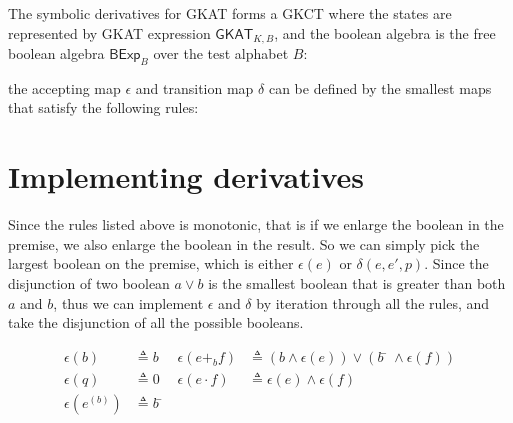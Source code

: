 \documentclass[acmsmall,screen]{acmart}
\newcommand{\theoryOf}[1]{\ensuremath{\mathsf{#1}}}
\newcommand{\GKAT}{\theoryOf{GKAT}}
\newcommand{\BExp}{\theoryOf{BExp}}
\newcommand\altxrightarrow[2][0pt]{\mathrel{\ensurestackMath{\stackengine%
  {\dimexpr#1-7.5pt}{\xrightarrow{\phantom{#2}}}{\scriptstyle\!#2\,}%
  {O}{c}{F}{F}{S}}}}
\newcommand{\transvia}[1]{
    \mathrel{\raisebox{-2px}{\(\altxrightarrow[-2px]{#1}\)}}
}
\begin{document}
The symbolic derivatives for GKAT forms a GKCT where the states are represented by GKAT expression \(\GKAT_{K, B}\), and the boolean algebra is the free boolean algebra \(\BExp_B\) over the test alphabet \(B\):
the accepting map \(ϵ\) and transition map \(δ\) can be defined by the smallest maps that satisfy the following rules:


\section{Implementing derivatives}

Since the rules listed above is monotonic, that is if we enlarge the boolean in the premise, we also enlarge the boolean in the result. 
So we can simply pick the largest boolean on the premise, which is either \(ϵ(e)\) or \(δ(e, e', p)\).
Since the disjunction of two boolean \(a ∨ b\) is the smallest boolean that is greater than both \(a\) and \(b\), thus we can implement \(ϵ\) and \(δ\) by iteration through all the rules, and take the disjunction of all the possible booleans.

\begin{align*}
    ϵ(b) & ≜ b 
        &  ϵ(e +_b f) & ≜ (b ∧ ϵ(e)) ∨ (b̄ ∧ ϵ(f))\\
    ϵ(q) & ≜ 0
        & ϵ(e ⋅ f) & ≜ ϵ(e) ∧ ϵ(f)\\  
    ϵ(e^{(b)}) & ≜ b̄ 
\end{align*}
\end{document}
